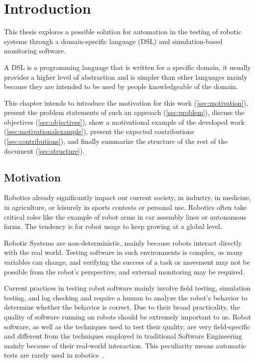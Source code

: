 \chapter{Introduction}
\label{chap:introduction}

This thesis explores a possible solution for automation in the testing of robotic systems through a domain-specific language (DSL) and simulation-based monitoring software.

A DSL is a programming language that is written for a specific domain, it usually provides a higher level of abstraction and is simpler than other languages mainly because they are intended to be used by people knowledgeable of the domain.

This chapter intends to introduce the motivation for this work (\autoref{sec:motivation}), present the problem statements of such an approach (\autoref{sec:problem}), discuss the objectives (\autoref{sec:objectives}), show a motivational example of the developed work (\autoref{sec:motivationalexample}), present the expected contributions (\autoref{sec:contributions}), and finally summarize the structure of the rest of the document (\autoref{sec:structure}).


\section{Motivation}
\label{sec:motivation}

Robotics already significantly impact our current society, in industry, in medicine, in agriculture, or leisurely in sports contests or personal use. Robotics often take critical roles like the example of robot arms in car assembly lines or autonomous farms. The tendency is for robot usage to keep growing at a global level. 

Robotic Systems are non-deterministic, mainly because robots interact directly with the real world. Testing software in such environments is complex, as many variables can change, and verifying the success of a task or movement may not be possible from the robot's perspective, and external monitoring may be required.

Current practices in testing robot software mainly involve field testing, simulation testing, and log checking and require a human to analyze the robot's behavior to determine whether the behavior is correct. Due to their broad practicality, the quality of software running on robots should be extremely important to us. Robot software, as well as the techniques used to test their quality, are very field-specific and different from the techniques employed in traditional Software Engineering mainly because of their real-world interaction. This peculiarity means automatic tests are rarely used in robotics~\cite{9240632,zizyte2021importance}.

